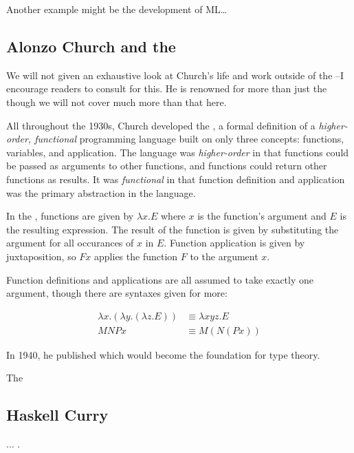 	Another example might be the development of ML\dots {}
\fi

\subsection{Alonzo Church and the \Lambdacalc}

We will not given an exhaustive look at Church's life and work outside of the
\lambdacalc--I encourage readers to consult 
for this.
He is renowned for more than just the \lambdacalc though we will not cover much more
than that here.

All throughout the 1930s, Church developed the \textit{\lambdacalc},
a formal definition of a \textit{higher-order, functional} programming language
built on only three concepts: functions, variables, and application.
The language was \textit{higher-order} in that functions could be passed
as arguments to other functions, and functions could return other functions as results.
It was \textit{functional} in that function definition and application was the
primary abstraction in the language.

In the \lambdacalc, functions are given by $\lambda x. E$ where $x$ is the function's argument
and $E$ is the resulting expression. The result of the function is given by substituting the
argument for all occurances of $x$ in $E$. Function application is given by juxtaposition,
so $F x$ applies the function $F$ to the argument $x$.

Function definitions and applications are all assumed to take exactly one argument,
though there are syntaxes given for more:

\begin{align}
	\lambda x . (\lambda y . (\lambda z . E)) & \equiv \lambda x y z . E
	\tag{function definition}
	\\
	M N P x                                   & \equiv M (N (P x))
	\tag{function application}
\end{align}

In 1940, he published 
which would become the foundation for type theory.

The \lambdacalc

\subsection{Haskell Curry}

...
.

